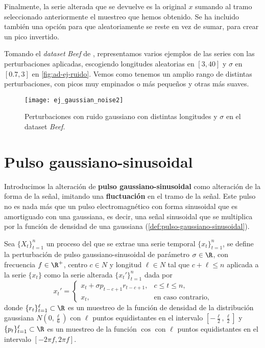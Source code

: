 Finalmente, la serie alterada que se devuelve es la original $x$ sumando al tramo seleccionado anteriormente el muestreo que hemos obtenido. Se ha incluido también una opción para que aleatoriamente se reste en vez de sumar, para crear un pico invertido.

Tomando el \emph{dataset} \emph{Beef} de \cite{bagnall2020ts}, representamos varios ejemplos de las series con las perturbaciones aplicadas, escogiendo longitudes aleatorias en $[3, 40]$ y $\sigma$ en $[0.7, 3]$ en \autoref{fig:ad-ej-ruido}. Vemos como tenemos un amplio rango de distintas perturbaciones, con picos muy empinados o más pequeños y otras más suaves.

\begin{figure}[htpb]
  \centering
  \texttt{[image: ej\_gaussian\_noise2]}
  \caption{Perturbaciones con ruido gaussiano con distintas longitudes y $\sigma$ en el dataset \emph{Beef}.}
  \label{fig:ad-ej-ruido}
\end{figure}

\section{Pulso gaussiano-sinusoidal}

Introducimos la alteración de \textbf{pulso gaussiano-sinusoidal} como alteración de la forma de la señal, imitando una \textbf{fluctuación} en el tramo de la señal. Este pulso no es nada más que un pulso electromagnético con forma sinusoidal que es amortiguado con una gaussiana, es decir, una señal sinusoidal que se multiplica por la función de densidad de una gaussiana (\autoref{def:pulso-gaussiano-sinusoidal}).

\begin{definicion}
  Sea $\{X_t\}_{t = 1}^n$ un proceso del que se extrae una serie temporal $\{x_t\}_{t = 1}^n$, se define la perturbación de pulso gaussiano-sinusoidal de parámetro $\sigma \in \R$, con frecuencia $f \in \R^{+}$, centro $c \in N$ y longitud $\ell \in N$ tal que $c + \ell \leq n$ aplicada a la serie $\{x_t\}$ como la serie alterada $\{x_t'\}_{t = 1}^n$ dada por
  $$x_t' = \begin{cases}
    x_t + \sigma p_{t - c + 1} r_{t - c + 1}, & c \leq t \leq n, \\
    x_t, & \text{en caso contrario,}
  \end{cases}$$
  donde $\{r_t\}_{t = 1}^\ell \subset \R$ es un muestreo de la función de densidad de la distribución gaussiana $N(0, \frac{\ell}{6})$ con $\ell$ puntos equidistantes en el intervalo $[-\frac{\ell}{2}, \frac{\ell}{2}]$ y $\{p_t\}_{t = 1}^\ell \subset \R$ es un muestreo de la función $\cos$ con $\ell$ puntos equidistantes en el intervalo $[-2\pi f, 2\pi f]$.
  \label{def:pulso-gaussiano-sinusoidal}
\end{definicion}


